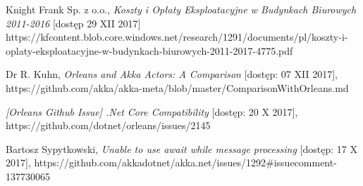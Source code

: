 \begin{thebibliography}{10}%


Knight Frank Sp. z o.o., \emph{Koszty i Opłaty Eksploatacyjne w Budynkach Biurowych 2011-2016} [dostęp 29 XII 2017] 
https://kfcontent.blob.core.windows.net/research/1291/documents/pl/koszty-i-oplaty-eksploatacyjne-w-budynkach-biurowych-2011-2017-4775.pdf

Dr R. Kuhn, \emph{Orleans and Akka Actors: A Comparison} [dostęp: 07 XII 2017],
https://github.com/akka/akka-meta/blob/master/ComparisonWithOrleans.md

 \emph{[Orleans Github Issue] .Net Core Compatibility} [dostęp: 20 X 2017],
https://github.com/dotnet/orleans/issues/2145

 Bartosz Sypytkowski, \emph{Unable to use await while message processing} [dostęp: 17 X 2017], 
https://github.com/akkadotnet/akka.net/issues/1292\#issuecomment-137730065


\end{thebibliography}